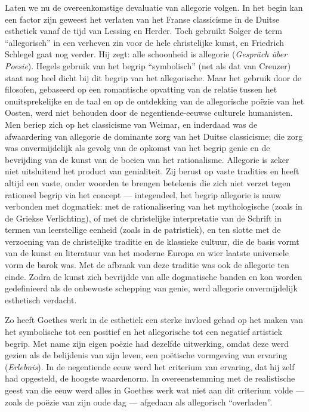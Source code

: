 Laten we nu de overeenkomstige devaluatie van allegorie volgen. In het begin kan een factor zijn geweest het verlaten van het Franse classicisme in de Duitse esthetiek vanaf de tijd van Lessing en Herder. Toch gebruikt Solger de term ``allegorisch'' in een verheven zin voor de hele christelijke kunst, en Friedrich Schlegel gaat nog verder. Hij zegt: alle schoonheid is allegorie (\textit{Gespräch über Poesie}). Hegels gebruik van het begrip ``symbolisch'' (net als dat van Creuzer) staat nog heel dicht bij dit begrip van het allegorische. Maar het gebruik door de filosofen, gebaseerd op een romantische opvatting van de relatie tussen het onuitsprekelijke en de taal en op de ontdekking van de allegorische poëzie van het Oosten, werd niet behouden door de negentiende-eeuwse culturele humanisten. Men beriep zich op het classicisme van Weimar, en inderdaad was de afwaardering van allegorie de dominante zorg van het Duitse classicisme; die zorg was onvermijdelijk als gevolg van de opkomst van het begrip genie en de bevrijding van de kunst van de boeien van het rationalisme. Allegorie is zeker niet uitsluitend het product van genialiteit. Zij berust op vaste tradities en heeft altijd een vaste, onder woorden te brengen betekenis die zich niet verzet tegen rationeel begrip via het concept — integendeel, het begrip allegorie is nauw verbonden met dogmatiek: met de rationalisering van het mythologische (zoals in de Griekse Verlichting), of met de christelijke interpretatie van de Schrift in termen van leerstellige eenheid (zoals in de patristiek), en ten slotte met de verzoening van de christelijke traditie en de klassieke cultuur, die de basis vormt van de kunst en literatuur van het moderne Europa en wier laatste universele vorm de barok was. Met de afbraak van deze traditie was ook de allegorie ten einde. Zodra de kunst zich bevrijdde van alle dogmatische banden en kon worden gedefinieerd als de onbewuste schepping van genie, werd allegorie onvermijdelijk esthetisch verdacht.

Zo heeft Goethes werk in de esthetiek een sterke invloed gehad op het maken van het symbolische tot een positief en het allegorische tot een negatief artistiek begrip. Met name zijn eigen poëzie had dezelfde uitwerking, omdat deze werd gezien als de belijdenis van zijn leven, een poëtische vormgeving van ervaring (\textit{Erlebnis}). In de negentiende eeuw werd het criterium van ervaring, dat hij zelf had opgesteld, de hoogste waardenorm. In overeenstemming met de realistische geest van die eeuw werd alles in Goethes werk wat niet aan dit criterium volde — zoals de poëzie van zijn oude dag — afgedaan als allegorisch ``overladen''.

